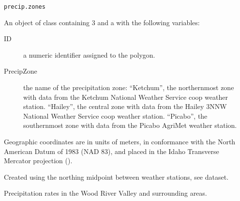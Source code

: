 \documentclass[letterpaper]{book}
\begin{document}
%
\begin{Usage}
\begin{verbatim}
precip.zones
\end{verbatim}
\end{Usage}
%
\begin{Format}
An object of  class containing 3  and a  with the following variables:
\begin{description}

\item[ID] a numeric identifier assigned to the polygon.
\item[PrecipZone] the name of the precipitation zone:
``Ketchum'', the northernmost zone with data from the Ketchum National Weather Service coop weather station.
``Hailey'', the central zone with data from the Hailey 3NNW National Weather Service coop weather station.
``Picabo'', the southernmost zone with data from the Picabo AgriMet weather station.


\end{description}

Geographic coordinates are in units of meters, in conformance with the North American Datum of 1983 (NAD 83), and placed in the
Idaho Transverse Mercator projection ().
\end{Format}
%
\begin{Source}\relax
Created using the northing midpoint between weather stations, see  dataset.
\end{Source}
%
\begin{SeeAlso}\relax
{}
\end{SeeAlso}
%
\begin{Examples}
\end{Examples}
%
\begin{Description}\relax
Precipitation rates in the Wood River Valley and surrounding areas.
\end{Description}
\end{document}
